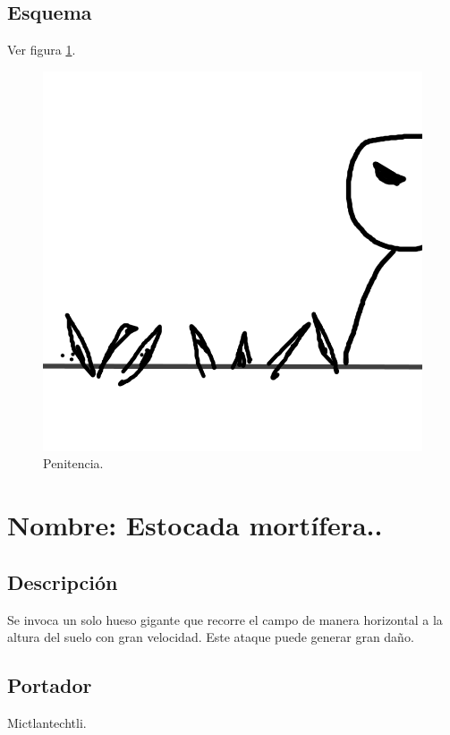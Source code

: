 \subsection{Esquema}
			Ver figura \ref{fig:penitencia}.
			\begin{figure}
				\centering
				\includegraphics[height=0.2 \textheight]{Imagenes/penitencia}
				\caption{Penitencia.}
				\label{fig:penitencia}
			\end{figure}
			
\section{Nombre: Estocada mortífera..}\label{hab.estMor}
\subsection{Descripción}
Se invoca un solo hueso gigante que recorre el campo de manera horizontal a la altura del suelo con gran velocidad. Este ataque puede generar gran daño.
\subsection{Portador}
Mictlantechtli.
